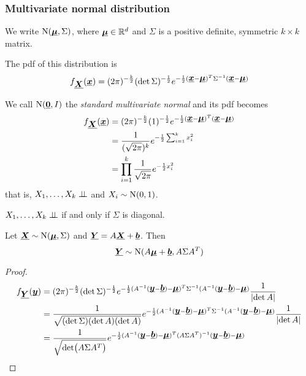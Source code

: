 \documentclass[12pt]{extarticle}
\newcommand{\Normal}{{\operatorfont N}}
\renewcommand{\vec}[1]{\uvec{#1}}
\begin{document}
\subsubsection{Multivariate normal distribution}

We write $\Normal(\vec \mu, \Sigma)$, where $\vec \mu \in \R^d$ and $\Sigma$ is a positive definite, symmetric $k \times k$ matrix.

The pdf of this distribution is
\begin{equation}
    f_{\vec X}(\vec x) = (2 \pi)^{-\frac{k}{2}} (\det \Sigma)^{-\frac{1}{2}} e^{-\frac{1}{2}(\vec x - \vec \mu)^T \Sigma^{-1} (\vec x - \vec \mu)}
\end{equation}

We call $\Normal(\vec 0, I)$ the \emph{standard multivariate normal} and its pdf becomes
\begin{align}
    f_{\vec X}(\vec x) & = (2 \pi)^{-\frac{k}{2}} (1)^{-\frac{1}{2}} e^{-\frac{1}{2}(\vec x - \vec \mu)^T (\vec x - \vec \mu)} \\
                       & = \frac{1}{(\sqrt{2 \pi})^k} e^{-\frac{1}{2} \sum_{i = 1}^k x_i^2}                                    \\
                       & = \prod_{i = 1}^k \frac{1}{\sqrt{2\pi}} e^{-\frac{1}{2}x_i^2}
\end{align}
that is, $X_1, \ldots, X_k \perp \!\!\! \perp$ and $X_i \sim \Normal(0,1)$.

\begin{lemma}
    $X_1, \ldots, X_k \perp \!\!\! \perp$ if and only if $\Sigma$ is diagonal.
\end{lemma}

\begin{proposition}
    Let $\vec X \sim \Normal(\vec \mu, \Sigma)$ and $\vec Y = A \vec X + \vec b$.
    Then
    \begin{equation}
        \vec Y \sim \Normal(A \vec \mu + \vec b, A \Sigma A^T)
    \end{equation}
\end{proposition}

\begin{proof}
    \begin{align}
        f_{\vec Y}(\vec y) & = (2 \pi)^{-\frac{k}{2}} (\det \Sigma)^{-\frac{1}{2}} e^{-\frac{1}{2}(A^{-1}(\vec y - \vec b) - \vec \mu)^T \Sigma^{-1} (A^{-1}(\vec y - \vec b) - \vec \mu)} \frac{1}{\abs{\det A}} \\
                           & = \frac{1}{\sqrt{(\det \Sigma)(\det A)(\det A)}} e^{-\frac{1}{2}(A^{-1}(\vec y - \vec b) - \vec \mu)^T \Sigma^{-1} (A^{-1}(\vec y - \vec b) - \vec \mu)} \frac{1}{\abs{\det A}}      \\
                           & = \frac{1}{\sqrt{\det(A \Sigma A^T)}} e^{-\frac{1}{2}(A^{-1}(\vec y - \vec b) - \vec \mu)^T (A \Sigma A^T)^{-1} (\vec y - \vec b) - \vec \mu)}
    \end{align}
\end{proof}
\end{document}
